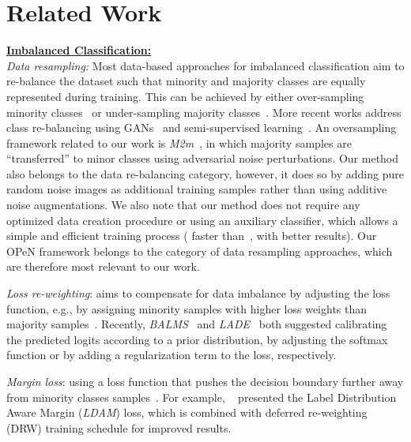 \documentclass[nohyperref]{article}
\theoremstyle{plain}
\theoremstyle{definition}
\theoremstyle{remark}
\begin{document}
\section{Related Work}
\vspace{-0.05cm}
\noindent \textbf{\underline{Imbalanced Classification:}} \\
\noindent\textit{Data resampling:} Most data-based approaches for imbalanced classification aim to re-balance the dataset such that minority and majority classes are equally represented during training. This can be achieved by either over-sampling minority classes~\cite{chawla2002smote, wang2014hybrid, shen2016relay} or under-sampling majority classes~\cite{drummond2003c4,liu2008exploratory, galar2013eusboost}. More recent works address class re-balancing using GANs~\cite{mullick2019generative, hao2020annealing} and semi-supervised learning~\cite{wei2021crest}. An oversampling framework related to our work is \textit{M2m}~\cite{kim2020m2m}, in which majority samples are “transferred” to minor classes using adversarial noise perturbations. Our method also belongs to the data re-balancing category, however, it does so by adding pure random noise images as additional training samples rather than using additive noise augmentations. We also note that our method does not require any optimized data creation procedure or using an auxiliary classifier, which allows a simple and efficient training process ( faster than~\cite{kim2020m2m}, with better results).
Our OPeN framework belongs to the category of data resampling approaches, which are therefore most relevant to our work. 

\noindent \textit{Loss re-weighting}: aims to compensate for data imbalance by adjusting the loss function, e.g., by assigning minority samples with higher loss weights than majority samples~\cite{li2021autobalance, buda2018systematic,cui2019class,ren2018learning,park2021influence}. Recently,  \textit{BALMS}~\cite{ren2020balanced} and \textit{LADE}~\cite{hong2021disentangling} both suggested calibrating the predicted logits according to a prior distribution, by adjusting the softmax function or by adding a regularization term to the loss, respectively. 

\noindent \textit{Margin loss}: using a loss function that pushes the decision boundary further away from minority classes samples~\cite{zhang2017range,dong2018imbalanced}. For example, ~\cite{cao2019learning} presented the Label Distribution Aware Margin (\textit{LDAM}) loss, which is combined with deferred re-weighting (DRW) training schedule for improved results. 
\end{document}
